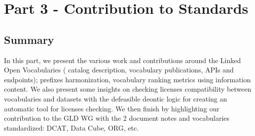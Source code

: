 \chapter*{Part 3 - Contribution to Standards}
\label{part:part3}

\vspace{10mm}
\section*{Summary}
In this part, we present the various work and contributions around the Linked Open Vocabularies ( catalog description, vocabulary publications, APIs and endpoints); prefixes harmonization, vocabulary ranking metrics using information content. We also present some insights on checking licenses compatibility between vocabularies and datasets with the defeasible deontic logic for creating an automatic tool for licenses checking.  We then finish by highlighting our contribution to the GLD WG with the 2 document notes and vocabularies standardized: DCAT, Data Cube, ORG, etc.
